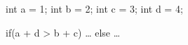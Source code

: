 \begin{minipage}[t]{2.5in}
\begin{AVerb}[numbers=left]
int a = 1; \label{lst_back3_start}
int b = 2; 
int c = 3; 
int d = 4; \label{lst_back3_end}

if(a + d > b + c)
  \dots
else
  \dots
\end{AVerb}
\end{minipage}
